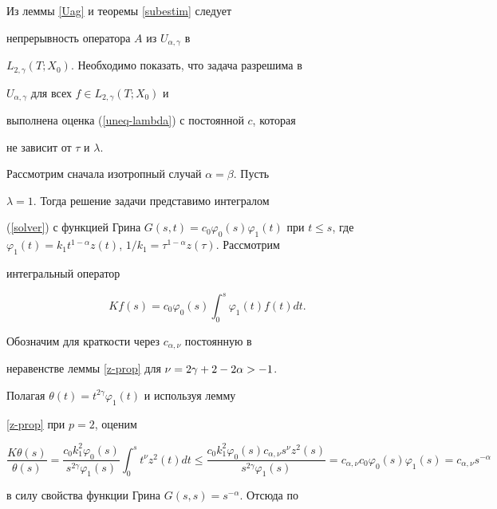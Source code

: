 \begin{pf}


Из леммы \ref{Uag} и теоремы \ref{subestim} следует


непрерывность оператора $A$ из $U_{\alpha,\gamma}$ в


$L_{2,\gamma}(T;X_0)$. Необходимо показать, что задача разрешима в


$U_{\alpha,\gamma}$ для всех $f \in L_{2,\gamma}(T;X_0)$ и


выполнена оценка (\ref{uneq-lambda}) с постоянной $c$, которая


 не зависит от $\tau$ и $\lambda$.





Рассмотрим сначала изотропный случай $\alpha=\beta$. Пусть


$\lambda=1$. Тогда решение задачи представимо интегралом


(\ref{solver}) с функцией Грина $G(s,t)=c_0 \varphi_0(s)


\varphi_1(t)$ при $t \le s$, где $\varphi_1(t)=k_1


t^{1-\alpha}z(t)$, $1/k_1=\tau^{1-\alpha}z(\tau)$. Рассмотрим


интегральный оператор


$$


K f(s)=c_0 \varphi_0(s) \int_0^s \varphi_1(t) f(t) d t.


$$


Обозначим для краткости через $c_{\alpha,\nu}$ постоянную в


неравенстве леммы \ref{z-prop} для $\nu=2\gamma+2-\linebreak 2\alpha>-1$.


Полагая $\theta(t)=t^{2\gamma}\varphi_1(t)$ и используя лемму


\ref{z-prop} при $p=2$, оценим


$$


\frac{K\theta(s)}{\theta(s)}=


\frac{c_0 k_1^2


\varphi_0(s)}{s^{2\gamma}\varphi_1(s)}\int_0^s t^\nu


z^2(t) d t \le \frac{c_0 k_1^2 \varphi_0(s)c_{\alpha,\nu}s^\nu z^2(s)}


{s^{2\gamma}\varphi_1(s)} =c_{\alpha,\nu}c_0


\varphi_0(s)\varphi_1(s)=c_{\alpha,\nu}s^{-\alpha}


$$


в силу свойства функции Грина $G(s,s)=s^{-\alpha}$. Отсюда по



\end{pf}
